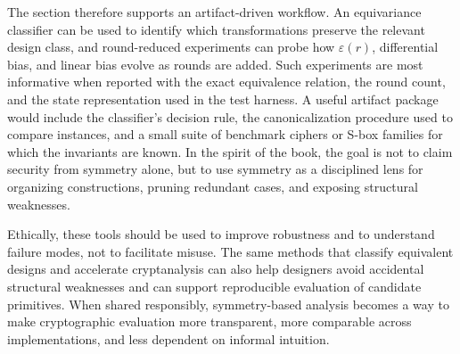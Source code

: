 The section therefore supports an artifact-driven workflow. An equivariance classifier can be used to identify which transformations preserve the relevant design class, and round-reduced experiments can probe how $\varepsilon(r)$, differential bias, and linear bias evolve as rounds are added. Such experiments are most informative when reported with the exact equivalence relation, the round count, and the state representation used in the test harness. A useful artifact package would include the classifier's decision rule, the canonicalization procedure used to compare instances, and a small suite of benchmark ciphers or S-box families for which the invariants are known. In the spirit of the book, the goal is not to claim security from symmetry alone, but to use symmetry as a disciplined lens for organizing constructions, pruning redundant cases, and exposing structural weaknesses.

Ethically, these tools should be used to improve robustness and to understand failure modes, not to facilitate misuse. The same methods that classify equivalent designs and accelerate cryptanalysis can also help designers avoid accidental structural weaknesses and can support reproducible evaluation of candidate primitives. When shared responsibly, symmetry-based analysis becomes a way to make cryptographic evaluation more transparent, more comparable across implementations, and less dependent on informal intuition.
